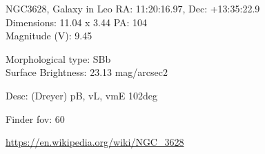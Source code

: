 \begin{block}{NGC3628, Galaxy in Leo}
    RA: 11:20:16.97, Dec: +13:35:22.9 \\ 
    Dimensions: 11.04 x 3.44 PA: 104 \\ 
    Magnitude (V): 9.45

    Morphological type: SBb \\ 
    Surface Brightness: 23.13 mag/arcsec2 

    Desc: (Dreyer) pB, vL, vmE 102deg 

    Finder fov: 60 

    \url{https://en.wikipedia.org/wiki/NGC_3628} 
\end{block}